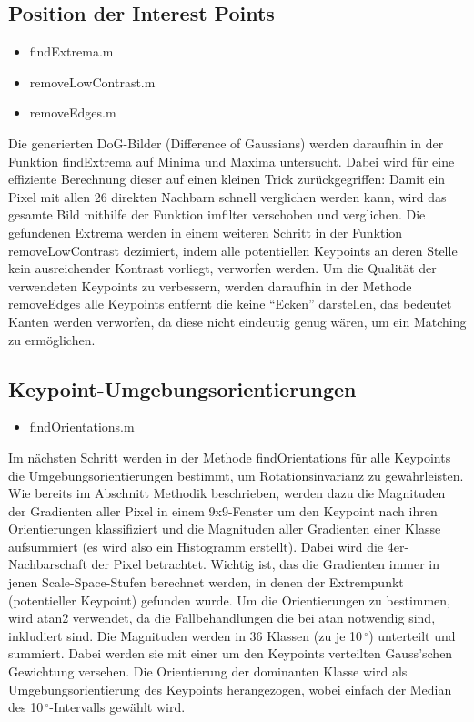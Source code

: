 \documentclass[deutsch]{scrartcl}
\begin{document}
\subsection{Position der Interest Points}
\begin{itemize}
	\item findExtrema.m 
	\item removeLowContrast.m
	\item removeEdges.m
\end{itemize}
Die generierten DoG-Bilder (Difference of
Gaussians) werden daraufhin in der Funktion findExtrema auf Minima und
Maxima untersucht. Dabei wird für eine effiziente Berechnung dieser auf
einen kleinen Trick zurückgegriffen: Damit ein Pixel mit allen 26 direkten
Nachbarn schnell verglichen werden kann, wird das gesamte Bild mithilfe der
Funktion imfilter verschoben und verglichen. Die gefundenen Extrema werden
in einem weiteren Schritt in der Funktion removeLowContrast dezimiert, indem
alle potentiellen Keypoints an deren Stelle kein ausreichender Kontrast
vorliegt, verworfen werden. Um die Qualität der verwendeten Keypoints zu
verbessern, werden daraufhin in der Methode removeEdges alle Keypoints
entfernt die keine "`Ecken"' darstellen, das bedeutet Kanten werden
verworfen, da diese nicht eindeutig genug wären, um ein Matching zu
ermöglichen.

\subsection{Keypoint-Umgebungsorientierungen}
\begin{itemize}
	\item findOrientations.m 
\end{itemize}
Im nächsten Schritt werden in der Methode findOrientations für alle Keypoints die Umgebungsorientierungen bestimmt, um Rotationsinvarianz zu gewährleisten. Wie bereits im Abschnitt Methodik beschrieben, werden dazu die Magnituden der Gradienten aller Pixel in einem 9x9-Fenster um den Keypoint nach ihren Orientierungen klassifiziert und die Magnituden aller Gradienten einer Klasse aufsummiert (es wird also ein Histogramm erstellt). Dabei wird die 4er-Nachbarschaft der Pixel betrachtet. Wichtig ist, das die Gradienten immer in jenen Scale-Space-Stufen berechnet werden, in denen der Extrempunkt (potentieller Keypoint) gefunden wurde. Um die Orientierungen zu bestimmen, wird atan2 verwendet, da die Fallbehandlungen die bei atan notwendig sind, inkludiert sind. Die Magnituden werden in 36 Klassen (zu je 10$\,^{\circ}$) unterteilt und summiert. Dabei werden sie mit einer um den Keypoints verteilten Gauss'schen Gewichtung versehen. Die Orientierung der dominanten Klasse wird als Umgebungsorientierung des Keypoints herangezogen, wobei einfach der Median des 10$\,^{\circ}$-Intervalls gewählt wird.\cite{lowe04} 
\end{document}

